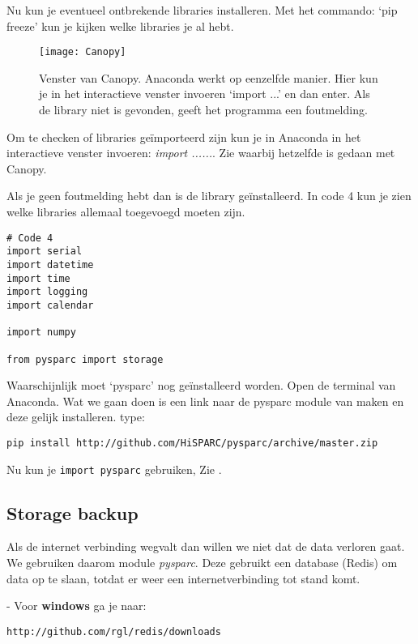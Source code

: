 Nu kun je eventueel ontbrekende libraries installeren. Met het commando:
`pip freeze' kun je kijken welke libraries je al hebt.

\begin{figure}
    \centering
    \texttt{[image: Canopy]}
    \caption{Venster van Canopy. Anaconda werkt op eenzelfde manier. Hier kun je
    in het interactieve venster invoeren `import ...' en dan enter. Als de library
    niet is gevonden, geeft het programma een foutmelding.}
   \label{fig:canopy1}
\end{figure}

Om te checken of libraries geïmporteerd zijn kun je in Anaconda in het
interactieve venster invoeren: \emph{import ......}. Zie
 waarbij hetzelfde is gedaan met Canopy.

Als je geen foutmelding hebt dan is de library geïnstalleerd.
In code 4 kun je zien welke libraries allemaal toegevoegd moeten zijn.

\begin{verbatim}
# Code 4
import serial
import datetime
import time
import logging
import calendar

import numpy

from pysparc import storage

\end{verbatim}

Waarschijnlijk moet `pysparc' nog geïnstalleerd worden. Open de terminal van
Anaconda. Wat we gaan doen is een link naar de pysparc module van \hisparc
maken en deze gelijk installeren. type:
\begin{verbatim}
pip install http://github.com/HiSPARC/pysparc/archive/master.zip
\end{verbatim}

Nu kun je \verb|import pysparc| gebruiken, Zie .


\subsection{Storage backup}

Als de internet verbinding wegvalt dan willen we niet dat de data verloren gaat.
We gebruiken daarom module \emph{pysparc}. Deze gebruikt een database (Redis) om data
op te slaan, totdat er weer een internetverbinding tot stand komt.

- Voor \textbf{windows} ga je naar:
\begin{verbatim}
http://github.com/rgl/redis/downloads
\end{verbatim}

